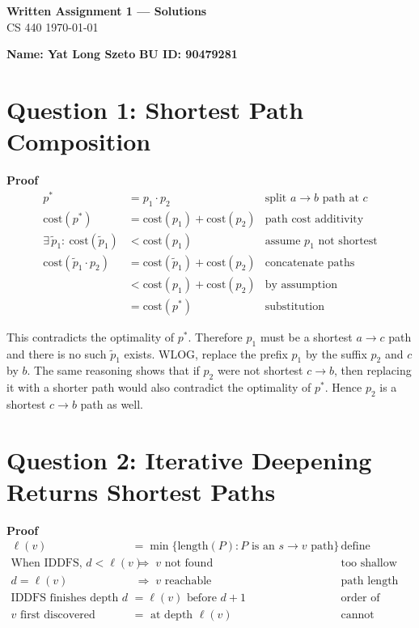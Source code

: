 \documentclass[11pt]{article}
\theoremstyle{definition}
\theoremstyle{remark}
\begin{document}
\begin{center}
{\Large \textbf{Written Assignment 1 — Solutions}}\\[0.25em]
CS 440 \quad \today
\end{center}

\noindent\textbf{Name: Yat Long Szeto} \quad
\textbf{BU ID:  90479281} 

\bigskip

\section*{Question 1: Shortest Path Composition}

\noindent\textbf{Proof}\\
\begin{align*}
p^\ast &= p_1 \cdot p_2 &\text{split $a\!\to\! b$ path at $c$}\\
\text{cost}(p^\ast) &= \text{cost}(p_1) + \text{cost}(p_2) &\text{path cost additivity}\\
\exists\,\tilde p_1:\ \text{cost}(\tilde p_1) &< \text{cost}(p_1) &\text{assume $p_1$ not shortest}\\
\text{cost}(\tilde p_1 \cdot p_2) &= \text{cost}(\tilde p_1) + \text{cost}(p_2) &\text{concatenate paths}\\
&< \text{cost}(p_1) + \text{cost}(p_2) &\text{by assumption}\\
&= \text{cost}(p^\ast) &\text{substitution}
\end{align*}

This contradicts the optimality of $p^\ast$.
Therefore $p_1$ must be a shortest $a\!\to\! c$ path and there is no such $\tilde p_1$ exists.  
WLOG, replace the prefix $p_1$ by the suffix $p_2$ and $c$ by $b$. 
The same reasoning shows that if $p_2$ were not shortest $c\!\to\! b$, 
then replacing it with a shorter path would also contradict the optimality of $p^\ast$. 
Hence $p_2$ is a shortest $c\!\to\! b$ path as well.

\section*{Question 2: Iterative Deepening Returns Shortest Paths}

\noindent\textbf{Proof}\\
\begin{align*}
\ell(v) &= \min\{\text{length}(P): P \text{ is an $s\!\to\! v$ path}\} &\text{define shortest distance}\\
\text{When IDDFS, } d < \ell(v) &\;\Rightarrow\; \text{$v$ not found} &\text{too shallow}\\
d = \ell(v) &\;\Rightarrow\; \text{$v$ reachable} &\text{path length fits}\\
\text{IDDFS finishes depth } d &= \ell(v) \text{ before } d+1 &\text{order of search}\\
v \text{ first discovered} &= \text{ at depth } \ell(v) &\text{cannot appear earlier}\\
\end{align*}
\end{document}
